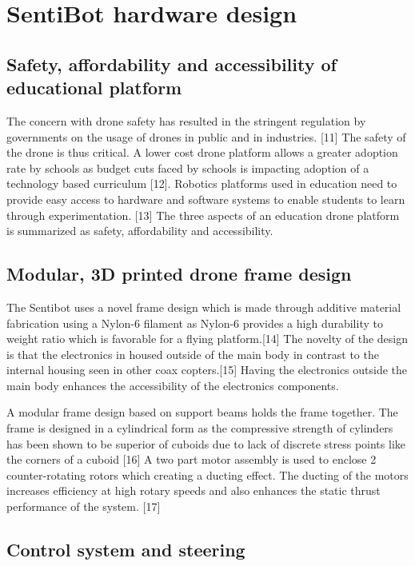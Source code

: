 \documentclass[12pt]{article}
\begin{document}
\section{SentiBot hardware design}

\subsection{Safety, affordability and accessibility of educational platform}

The concern with drone safety has resulted in the stringent regulation by governments on the usage of drones in public and in industries. [11] The safety of the drone is thus critical. A lower cost drone platform allows a greater adoption rate by schools as budget cuts faced by schools is impacting adoption of a technology based curriculum [12]. Robotics platforms used in education need to provide easy access to hardware and software systems to enable students to learn through experimentation. [13] The three aspects of an education drone platform is summarized as safety, affordability and accessibility. 

\subsection{Modular, 3D printed drone frame design}

The Sentibot uses a novel frame design which is made through additive material fabrication using a Nylon-6 filament as Nylon-6 provides a high durability to weight ratio which is favorable for a flying platform.[14] The novelty of the design is that the electronics in housed outside of the main body in contrast to the internal housing seen in other coax copters.[15] Having the electronics outside the main body enhances the accessibility of the electronics components. 

A modular frame design based on support beams holds the frame together. The frame is designed in a cylindrical form as the compressive strength of cylinders has been shown to be superior of cuboids due to lack of discrete stress points like the corners of a cuboid [16] A two part motor assembly is used to enclose 2 counter-rotating rotors which creating a ducting effect. The ducting of the motors increases efficiency at high rotary speeds and also enhances the static thrust performance of the system. [17] 

\subsection{Control system and steering}
\end{document}
